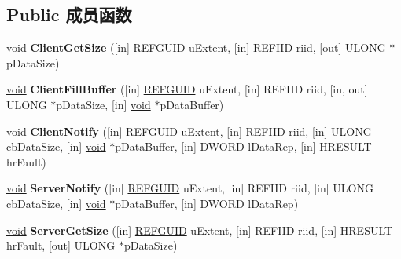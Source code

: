 \subsection*{Public 成员函数}
\begin{DoxyCompactItemize}
\item 
\mbox{\label{interface_i_channel_hook_a58771f0c87d63c58f3a18bd8952ebb80}} 
\hyperlink{interfacevoid}{void} {\bfseries Client\+Get\+Size} (\mbox{[}in\mbox{]} \hyperlink{struct___g_u_i_d}{R\+E\+F\+G\+U\+ID} u\+Extent, \mbox{[}in\mbox{]} R\+E\+F\+I\+ID riid, \mbox{[}out\mbox{]} U\+L\+O\+NG $\ast$p\+Data\+Size)
\item 
\mbox{\label{interface_i_channel_hook_afa65b2fed984c63397994ee8e1f436b6}} 
\hyperlink{interfacevoid}{void} {\bfseries Client\+Fill\+Buffer} (\mbox{[}in\mbox{]} \hyperlink{struct___g_u_i_d}{R\+E\+F\+G\+U\+ID} u\+Extent, \mbox{[}in\mbox{]} R\+E\+F\+I\+ID riid, \mbox{[}in, out\mbox{]} U\+L\+O\+NG $\ast$p\+Data\+Size, \mbox{[}in\mbox{]} \hyperlink{interfacevoid}{void} $\ast$p\+Data\+Buffer)
\item 
\mbox{\label{interface_i_channel_hook_a6317f00306447961ef078fdd4e646be0}} 
\hyperlink{interfacevoid}{void} {\bfseries Client\+Notify} (\mbox{[}in\mbox{]} \hyperlink{struct___g_u_i_d}{R\+E\+F\+G\+U\+ID} u\+Extent, \mbox{[}in\mbox{]} R\+E\+F\+I\+ID riid, \mbox{[}in\mbox{]} U\+L\+O\+NG cb\+Data\+Size, \mbox{[}in\mbox{]} \hyperlink{interfacevoid}{void} $\ast$p\+Data\+Buffer, \mbox{[}in\mbox{]} D\+W\+O\+RD l\+Data\+Rep, \mbox{[}in\mbox{]} H\+R\+E\+S\+U\+LT hr\+Fault)
\item 
\mbox{\label{interface_i_channel_hook_aa5f0402a3d1f50a668ff28fe1d8b20ee}} 
\hyperlink{interfacevoid}{void} {\bfseries Server\+Notify} (\mbox{[}in\mbox{]} \hyperlink{struct___g_u_i_d}{R\+E\+F\+G\+U\+ID} u\+Extent, \mbox{[}in\mbox{]} R\+E\+F\+I\+ID riid, \mbox{[}in\mbox{]} U\+L\+O\+NG cb\+Data\+Size, \mbox{[}in\mbox{]} \hyperlink{interfacevoid}{void} $\ast$p\+Data\+Buffer, \mbox{[}in\mbox{]} D\+W\+O\+RD l\+Data\+Rep)
\item 
\mbox{\label{interface_i_channel_hook_a8b7dcfe56b961c6982f72e039d6155c6}} 
\hyperlink{interfacevoid}{void} {\bfseries Server\+Get\+Size} (\mbox{[}in\mbox{]} \hyperlink{struct___g_u_i_d}{R\+E\+F\+G\+U\+ID} u\+Extent, \mbox{[}in\mbox{]} R\+E\+F\+I\+ID riid, \mbox{[}in\mbox{]} H\+R\+E\+S\+U\+LT hr\+Fault, \mbox{[}out\mbox{]} U\+L\+O\+NG $\ast$p\+Data\+Size)

\end{DoxyCompactItemize}
